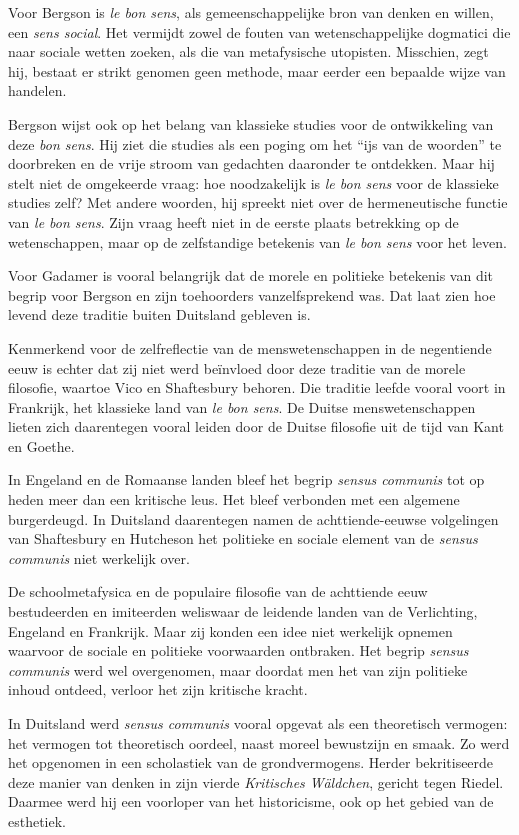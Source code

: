 Voor Bergson is \textit{le bon sens}, als gemeenschappelijke bron van denken en willen, een \textit{sens social}. Het vermijdt zowel de fouten van wetenschappelijke dogmatici die naar sociale wetten zoeken, als die van metafysische utopisten. Misschien, zegt hij, bestaat er strikt genomen geen methode, maar eerder een bepaalde wijze van handelen.

Bergson wijst ook op het belang van klassieke studies voor de ontwikkeling van deze \textit{bon sens}. Hij ziet die studies als een poging om het ``ijs van de woorden'' te doorbreken en de vrije stroom van gedachten daaronder te ontdekken. Maar hij stelt niet de omgekeerde vraag: hoe noodzakelijk is \textit{le bon sens} voor de klassieke studies zelf? Met andere woorden, hij spreekt niet over de hermeneutische functie van \textit{le bon sens}. Zijn vraag heeft niet in de eerste plaats betrekking op de wetenschappen, maar op de zelfstandige betekenis van \textit{le bon sens} voor het leven.

Voor Gadamer is vooral belangrijk dat de morele en politieke betekenis van dit begrip voor Bergson en zijn toehoorders vanzelfsprekend was. Dat laat zien hoe levend deze traditie buiten Duitsland gebleven is.

Kenmerkend voor de zelfreflectie van de menswetenschappen in de negentiende eeuw is echter dat zij niet werd beïnvloed door deze traditie van de morele filosofie, waartoe Vico en Shaftesbury behoren. Die traditie leefde vooral voort in Frankrijk, het klassieke land van \textit{le bon sens}. De Duitse menswetenschappen lieten zich daarentegen vooral leiden door de Duitse filosofie uit de tijd van Kant en Goethe.

In Engeland en de Romaanse landen bleef het begrip \textit{sensus communis} tot op heden meer dan een kritische leus. Het bleef verbonden met een algemene burgerdeugd. In Duitsland daarentegen namen de achttiende-eeuwse volgelingen van Shaftesbury en Hutcheson het politieke en sociale element van de \textit{sensus communis} niet werkelijk over.

De schoolmetafysica en de populaire filosofie van de achttiende eeuw bestudeerden en imiteerden weliswaar de leidende landen van de Verlichting, Engeland en Frankrijk. Maar zij konden een idee niet werkelijk opnemen waarvoor de sociale en politieke voorwaarden ontbraken. Het begrip \textit{sensus communis} werd wel overgenomen, maar doordat men het van zijn politieke inhoud ontdeed, verloor het zijn kritische kracht.

In Duitsland werd \textit{sensus communis} vooral opgevat als een theoretisch vermogen: het vermogen tot theoretisch oordeel, naast moreel bewustzijn en smaak. Zo werd het opgenomen in een scholastiek van de grondvermogens. Herder bekritiseerde deze manier van denken in zijn vierde \textit{Kritisches Wäldchen}, gericht tegen Riedel. Daarmee werd hij een voorloper van het historicisme, ook op het gebied van de esthetiek.

